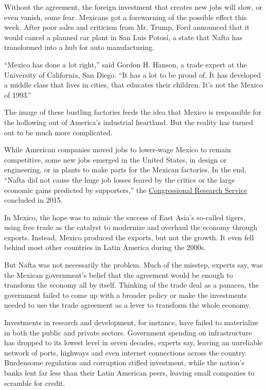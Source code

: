 Without the agreement, the foreign investment that creates new jobs will
slow, or even vanish, some fear. Mexicans got a forewarning of the
possible effect this week. After poor sales and criticism from Mr.
Trump, Ford announced that it would cancel a planned car plant in San
Luis Potosí, a state that Nafta has transformed into a hub for auto
manufacturing.

``Mexico has done a lot right,'' said Gordon H. Hanson, a trade expert
at the University of California, San Diego. ``It has a lot to be proud
of. It has developed a middle class that lives in cities, that educates
their children. It's not the Mexico of 1993.''

The image of these bustling factories feeds the idea that Mexico is
responsible for the hollowing out of America's industrial heartland. But
the reality has turned out to be much more complicated.

While American companies moved jobs to lower-wage Mexico to remain
competitive, some new jobs emerged in the United States, in design or
engineering, or in plants to make parts for the Mexican factories. In
the end, ``Nafta did not cause the huge job losses feared by the critics
or the large economic gains predicted by supporters,'' the
\href{https://fas.org/sgp/crs/row/R42965.pdf}{Congressional Research
Service} concluded in 2015.

In Mexico, the hope was to mimic the success of East Asia's so-called
tigers, using free trade as the catalyst to modernize and overhaul the
economy through exports. Instead, Mexico produced the exports, but not
the growth. It even fell behind most other countries in Latin America
during the 2000s.

But Nafta was not necessarily the problem. Much of the misstep, experts
say, was the Mexican government's belief that the agreement would be
enough to transform the economy all by itself. Thinking of the trade
deal as a panacea, the government failed to come up with a broader
policy or make the investments needed to use the trade agreement as a
lever to transform the whole economy.

Investments in research and development, for instance, have failed to
materialize in both the public and private sectors. Government spending
on infrastructure has dropped to its lowest level in seven decades,
experts say, leaving an unreliable network of ports, highways and even
internet connections across the country. Burdensome regulation and
corruption stifled investment, while the nation's banks lent far less
than their Latin American peers, leaving small companies to scramble for
credit.

